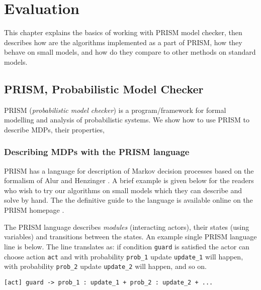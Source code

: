 \chapter{Evaluation}
\label{ch_evaluation}

This chapter explains the basics of working with PRISM model checker,
then describes how are the algorithms implemented as a part of PRISM,
how they behave on small models, and how do they compare to other
methods on standard models.

\section{PRISM, Probabilistic Model Checker}

PRISM \parencite{prism}
({\em probabilistic model checker}) is a program/framework
for formal modelling and analysis of probabilistic systems.
We show how to use PRISM to describe MDPs, their properties,

\subsection*{Describing MDPs with the PRISM language}
PRISM has a language for description of Markov decision processes
based on the formalism of Alur and Henzinger \parencite{ReactiveModules}.
A brief example is given below for the readers who wish to try our
algorithms on small models which they can describe and solve by hand.
The the definitive guide to the language is available online on the
PRISM homepage \parencite{prism_lang}.

The PRISM language describes {\em modules} (interacting actors),
their states (using variables) and transitions between the states.
An example single PRISM language line is below. The line translates as:
if condition \verb|guard| is satisfied the actor can choose action \verb|act|
and
with probability \verb|prob_1| update \verb|update_1| will happen,
with probability \verb|prob_2| update \verb|update_2| will happen,
and so on.

\begin{verbatim}
[act] guard -> prob_1 : update_1 + prob_2 : update_2 + ...
\end{verbatim}

